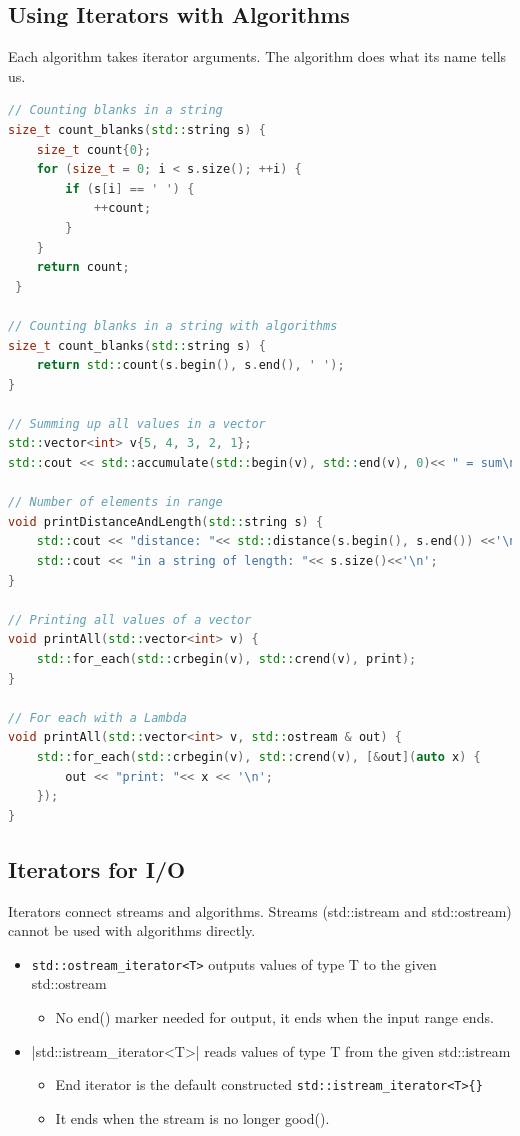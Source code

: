 \subsection{Using Iterators with Algorithms}
 Each algorithm takes iterator arguments. The algorithm does what its name tells us. 
 
\begin{lstlisting}[language=C++]
// Counting blanks in a string
size_t count_blanks(std::string s) {
 	size_t count{0};
 	for (size_t = 0; i < s.size(); ++i) {
 		if (s[i] == ' ') {
 			++count;
 		}
 	}
 	return count;
 }
 
// Counting blanks in a string with algorithms
size_t count_blanks(std::string s) {
	return std::count(s.begin(), s.end(), ' ');
}

// Summing up all values in a vector
std::vector<int> v{5, 4, 3, 2, 1}; 
std::cout << std::accumulate(std::begin(v), std::end(v), 0)<< " = sum\n";

// Number of elements in range 
void printDistanceAndLength(std::string s) {
	std::cout << "distance: "<< std::distance(s.begin(), s.end()) <<'\n';
	std::cout << "in a string of length: "<< s.size()<<'\n'; 
} 	

// Printing all values of a vector
void printAll(std::vector<int> v) {
	std::for_each(std::crbegin(v), std::crend(v), print); 
}

// For each with a Lambda
void printAll(std::vector<int> v, std::ostream & out) {
	std::for_each(std::crbegin(v), std::crend(v), [&out](auto x) {
		out << "print: "<< x << '\n';
	});
}

\end{lstlisting}


\subsection{Iterators for I/O}
Iterators connect streams and algorithms.  Streams (std::istream and std::ostream) cannot be used with algorithms directly.
\begin{itemize}
	\itemsep -0.5em 
  	\item \lstinline{std::ostream_iterator<T>} outputs values of type T to the given std::ostream
  	\begin{itemize}
  		\item No end() marker needed for output, it ends when the input range ends.
  	\end{itemize}
  	
  	\item  \lstlinline|std::istream_iterator<T>| reads values of type T from the given std::istream
	\begin{itemize}
  		\item End iterator is the default constructed \lstinline|std::istream_iterator<T>{}|
   		\item It ends when the stream is no longer good().
   	\end{itemize}
\end{itemize}

